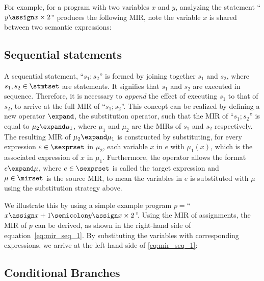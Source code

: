 For example, for a program with two variables $x$ and $y$, analyzing the
statement ``$y \assign x \times 2$'' produces the following MIR\@, note the
variable $x$ is shared between two semantic expressions:

\subsection{Sequential statements}
\label{sub:sequential_statements}

A sequential statement, ``$s_1 \semicolon s_2$'' is formed by joining together
$s_1$ and $s_2$, where $s_1, s_2 \in \stmtset$ are statements.  It signifies
that $s_1$ and $s_2$ are executed in sequence.  Therefore, it is necessary to
\emph{append} the effect of executing $s_1$ to that of $s_2$, to arrive at
the full MIR of ``$s_1 \semicolon s_2$''.  This concept can be realized by
defining a new operator $\expand$, the substitution operator, such that the MIR
of ``$s_1 \semicolon s_2$'' is equal to $\mu_2 \expand \mu_1$, where $\mu_1$
and $\mu_2$ are the MIRs of $s_1$ and $s_2$ respectively.  The resulting MIR
of $\mu_2 \expand \mu_1$ is constructed by substituting, for every expression
$e \in \sexprset$ in $\mu_2$, each variable $x$ in $e$ with $\mu_1(x)$, which
is the associated expression of $x$ in $\mu_1$.  Furthermore, the operator
allows the format $e \expand \mu$, where $e \in \sexprset$ is called the target
expression and $\mu \in \mirset$ is the source MIR, to mean the variables in
$e$ is substituted with $\mu$ using the substitution strategy above.

We illustrate this by using a simple example program $p = {}$``$x
\assign x + 1 \semicolon y \assign x \times 2$''.  Using the MIR of
assignments, the MIR of $p$ can be derived, as shown in the right-hand
side of equation~\eqref{eq:mir_seq_1}.  By substituting the variables
with corresponding expressions, we arrive at the left-hand side of
\eqref{eq:mir_seq_1}:

\subsection{Conditional Branches}


